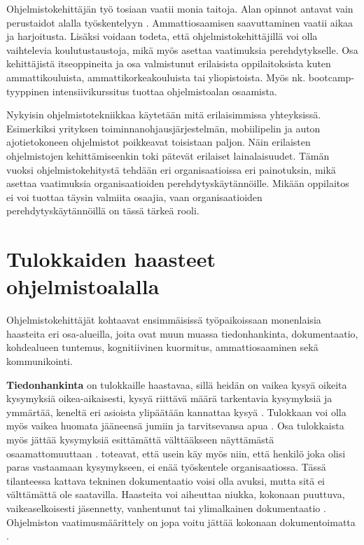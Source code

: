 \documentclass[utf8]{gradu3}
\begin{document}
Ohjelmistokehittäjän työ tosiaan vaatii monia taitoja. Alan opinnot antavat vain perustaidot alalla työskentelyyn \parencite{begel-simon-2008-all-over-again}. Ammattiosaamisen saavuttaminen vaatii aikaa ja harjoitusta. Lisäksi voidaan todeta, että ohjelmistokehittäjillä voi olla vaihtelevia koulutustaustoja, mikä myös asettaa vaatimuksia perehdytykselle. Osa kehittäjistä itseoppineita ja osa valmistunut erilaisista oppilaitoksista kuten ammattikouluista, ammattikorkeakouluista tai yliopistoista. Myös nk. bootcamp-tyyppinen intensiivikurssitus tuottaa ohjelmistoalan osaamista. 

Nykyisin ohjelmistotekniikkaa käytetään mitä erilaisimmissa yhteyksissä. Esimerkiksi yrityksen toiminnanohjausjärjestelmän, mobiilipelin ja auton ajotietokoneen ohjelmistot poikkeavat toisistaan paljon. Näin erilaisten ohjelmistojen kehittämiseenkin toki pätevät erilaiset lainalaisuudet. Tämän vuoksi ohjelmistokehitystä tehdään eri organisaatioissa eri painotuksin, mikä asettaa vaatimuksia organisaatioiden perehdytyskäytännöille. Mikään oppilaitos ei voi tuottaa täysin valmiita osaajia, vaan organisaatioiden perehdytyskäytännöillä on tässä tärkeä rooli.

\section{Tulokkaiden haasteet ohjelmistoalalla}
\label{luku-tulokkaiden-haasteet}

Ohjelmistokehittäjät kohtaavat ensimmäisissä työpaikoissaan monenlaisia haasteita eri osa-alueilla, joita ovat muun muassa tiedonhankinta, dokumentaatio, kohdealueen tuntemus, kognitiivinen kuormitus, ammattiosaaminen sekä kommunikointi. 

\textbf{Tiedonhankinta} on tulokkaille haastavaa, sillä heidän on vaikea kysyä oikeita kysymyksiä oikea-aikaisesti, kysyä riittävä määrä tarkentavia kysymyksiä ja ymmärtää, keneltä eri asioista ylipäätään kannattaa kysyä %
\parencites%
    {ju-ym-2021}%
    {britto-ym-2019}%
    {craig-ym-2018}%
    {matturro-ym-2017}%
    {dagenais-ym-2010}%
    {begel-simon-2008}%
\relax
%
. Tulokkaan voi olla myös vaikea huomata jääneensä jumiin ja tarvitsevansa apua \parencite{begel-simon-2008}. Osa tulokkaista myös jättää  kysymyksiä esittämättä välttääkseen näyttämästä osaamattomuuttaan 
\parencites%
    {radermacher-ym-2015}%
    {begel-simon-2008}%
\relax.
%
\textcite{dagenais-ym-2010} toteavat, että usein käy myös niin, että henkilö joka olisi paras vastaamaan kysymykseen, ei enää työskentele organisaatiossa. Tässä tilanteessa kattava tekninen dokumentaatio voisi olla avuksi, mutta sitä ei välttämättä ole saatavilla. Haasteita voi aiheuttaa niukka, kokonaan puuttuva, vaikeaselkoisesti jäsennetty, vanhentunut tai ylimalkainen dokumentaatio %
\parencites%
    {matturro-ym-2017}%
    {dagenais-ym-2010}%
    {begel-simon-2008}%
\relax
. Ohjelmiston vaatimusmäärittely on jopa voitu jättää kokonaan dokumentoimatta \parencite{matturro-ym-2017}.
\end{document}

